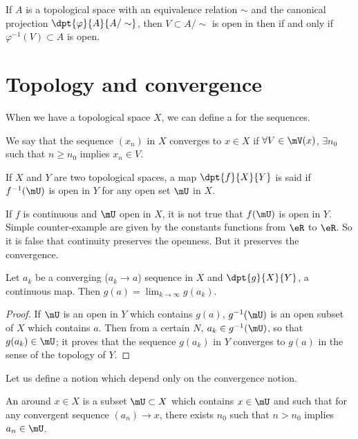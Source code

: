 If $A$ is a topological space with an equivalence relation $\sim$ and the canonical projection $\dpt{\varphi}{A}{A/\sim}$, then $V\subset A/\sim$ is open in then  if and only if $\varphi^{-1}(V)\subset A$ is open.

\section{Topology and convergence}

When we have a topological space $X$, we can define a  for the sequences.

\begin{definition}
	We say that the sequence $(x_n)$ in $X$ converges to $x\in X$ if
	$\forall V\in\mV(x)$, $\exists n_0$ such that $n\geq n_0$ implies $x_n\in V$. \label{def:convergence}
\end{definition}

\begin{definition}
	If $X$ and $Y$ are two topological spaces, a map $\dpt{f}{X}{Y}$ is said  if $f^{-1}(\mU)$ is open in $Y$ for any open set $\mU$ in $X$.
\end{definition}

If $f$ is continuous and $\mU$ open in $X$, it is not true that $f(\mU)$ is open in $Y$. Simple counter-example are given by the constants functions from $\eR$ to $\eR$. So it is false that continuity preserves the openness. But it preserves the convergence.

\begin{proposition}
	Let $a_k$ be a converging ($a_k\to a$) sequence in $X$ and $\dpt{g}{X}{Y}$, a continuous map. Then $g(a)=\lim_{k\to\infty}g(a_k)$.
	\label{prop:continu_cv}
\end{proposition}
\begin{proof}
	If $\mU$ is an open in $Y$ which contains $g(a)$, $g^{-1}(\mU)$ is an open subset of $X$ which contains $a$. Then from a certain $N$, $a_k\in g^{-1}(\mU)$, so that $g(a_k)\in\mU$; it proves that the sequence $g(a_k)$ in $Y$ converges to $g(a)$ in the sense of the topology of $Y$.
\end{proof}

Let us define a notion which depend only on the convergence notion.

\begin{definition}
	An  around $x\in X$ is a subset $\mU\subset X$ which contains $x\in\mU$ and such that for any convergent sequence $(a_n)\to x$, there exists $n_0$ such that $n>n_0$ implies $a_n\in\mU$.
\end{definition}

